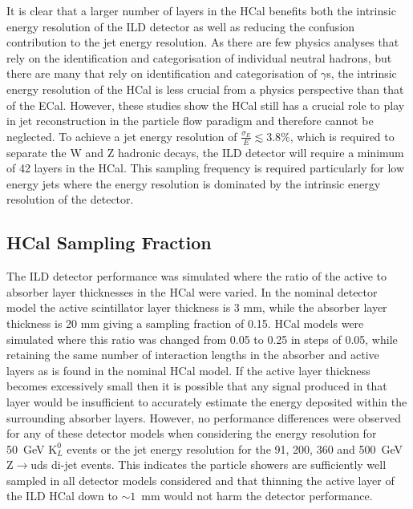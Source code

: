 It is clear that a larger number of layers in the HCal benefits both the intrinsic energy resolution of the ILD detector as well as reducing the confusion contribution to the jet energy resolution.  As there are few physics analyses that rely on the identification and categorisation of individual neutral hadrons, but there are many that rely on identification and categorisation of $\gamma$s, the intrinsic energy resolution of the HCal is less crucial from a physics perspective than that of the ECal.  However, these studies show the HCal still has a crucial role to play in jet reconstruction in the particle flow paradigm and therefore cannot be neglected.  To achieve a jet energy resolution of $\frac{\sigma_{E}}{E} \lesssim 3.8\%$, which is required to separate the W and Z hadronic decays, the ILD detector will require a minimum of 42 layers in the HCal.  This sampling frequency is required particularly for low energy jets where the energy resolution is dominated by the intrinsic energy resolution of the detector.


\subsection{HCal Sampling Fraction}
\label{sec:hcalsamplingfraction}
The ILD detector performance was simulated where the ratio of the active to absorber layer thicknesses in the HCal were varied.  In the nominal detector model the active scintillator layer thickness is 3 mm, while the absorber layer thickness is 20 mm giving a sampling fraction of 0.15.  HCal models were simulated where this ratio was changed from 0.05 to 0.25 in steps of 0.05, while retaining the same number of interaction lengths in the absorber and active layers as is found in the nominal HCal model.  If the active layer thickness becomes excessively small then it is possible that any signal produced in that layer would be insufficient to accurately estimate the energy deposited within the surrounding absorber layers.  However, no performance differences were observed for any of these detector models when considering the energy resolution for 50~GeV $\text{K}^{0}_{L}$ events or the jet energy resolution for the 91, 200, 360 and 500~GeV Z$\rightarrow$uds di-jet events.  This indicates the particle showers are sufficiently well sampled in all detector models considered and that thinning the active layer of the ILD HCal down to $\sim1$~mm would not harm the detector performance.  


